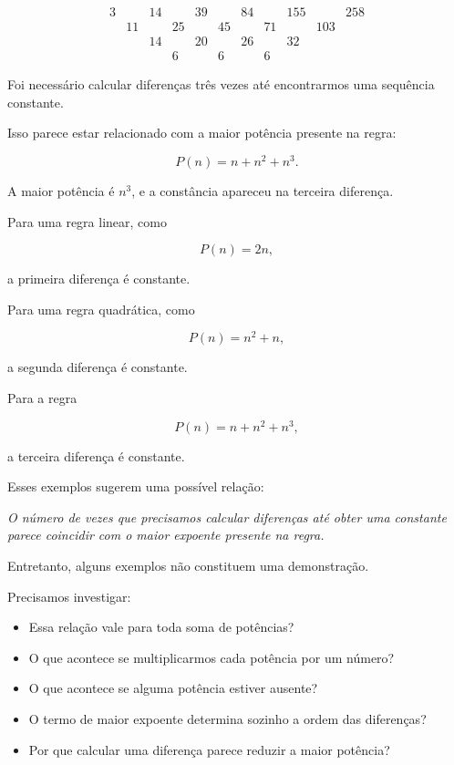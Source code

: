 \documentclass[12pt,a4paper]{article}
\begin{document}
\[
\begin{array}{ccccccccccc}
3 && 14 && 39 && 84 && 155 && 258\\
& 11 && 25 && 45 && 71 && 103\\
&& 14 && 20 && 26 && 32\\
&&& 6 && 6 && 6
\end{array}
\]

Foi necessário calcular diferenças três vezes até encontrarmos uma
sequência constante.

Isso parece estar relacionado com a maior potência presente na regra:

\[
P(n)=n+n^2+n^3.
\]

A maior potência é \(n^3\), e a constância apareceu na terceira
diferença.

Para uma regra linear, como

\[
P(n)=2n,
\]

a primeira diferença é constante.

Para uma regra quadrática, como

\[
P(n)=n^2+n,
\]

a segunda diferença é constante.

Para a regra

\[
P(n)=n+n^2+n^3,
\]

a terceira diferença é constante.

Esses exemplos sugerem uma possível relação:

\begin{center}
\emph{O número de vezes que precisamos calcular diferenças até obter
uma constante parece coincidir com o maior expoente presente na regra.}
\end{center}

Entretanto, alguns exemplos não constituem uma demonstração.

Precisamos investigar:

\begin{itemize}
    \item Essa relação vale para toda soma de potências?
    \item O que acontece se multiplicarmos cada potência por um número?
    \item O que acontece se alguma potência estiver ausente?
    \item O termo de maior expoente determina sozinho a ordem das
    diferenças?
    \item Por que calcular uma diferença parece reduzir a maior potência?
\end{itemize}
\end{document}
